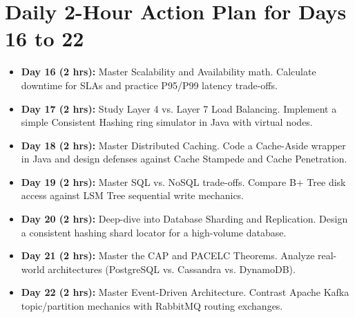 \documentclass[10pt,journal,compsoc,onecolumn]{IEEEtran}
\begin{document}
\section{Daily 2-Hour Action Plan for Days 16 to 22}
\label{sec:action_plan_vol3}

\begin{itemize}
    \item \textbf{Day 16 (2 hrs):} Master Scalability and Availability math. Calculate downtime for SLAs and practice P95/P99 latency trade-offs.
    \item \textbf{Day 17 (2 hrs):} Study Layer 4 vs. Layer 7 Load Balancing. Implement a simple Consistent Hashing ring simulator in Java with virtual nodes.
    \item \textbf{Day 18 (2 hrs):} Master Distributed Caching. Code a Cache-Aside wrapper in Java and design defenses against Cache Stampede and Cache Penetration.
    \item \textbf{Day 19 (2 hrs):} Master SQL vs. NoSQL trade-offs. Compare B+ Tree disk access against LSM Tree sequential write mechanics.
    \item \textbf{Day 20 (2 hrs):} Deep-dive into Database Sharding and Replication. Design a consistent hashing shard locator for a high-volume database.
    \item \textbf{Day 21 (2 hrs):} Master the CAP and PACELC Theorems. Analyze real-world architectures (PostgreSQL vs. Cassandra vs. DynamoDB).
    \item \textbf{Day 22 (2 hrs):} Master Event-Driven Architecture. Contrast Apache Kafka topic/partition mechanics with RabbitMQ routing exchanges.
\end{itemize}
\end{document}
